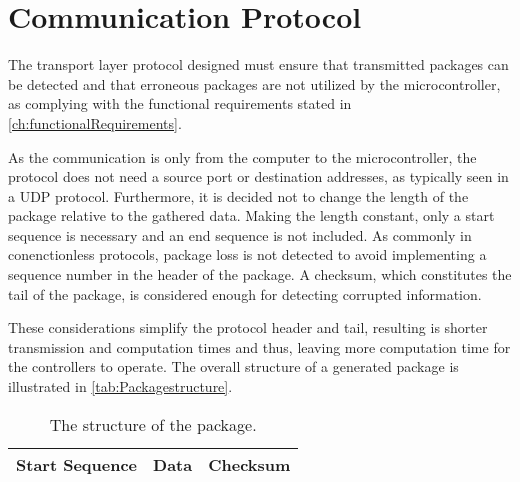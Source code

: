 \section{Communication Protocol}
The transport layer protocol designed must ensure that transmitted packages can be detected and that erroneous packages are not utilized by the microcontroller, as complying with the functional requirements stated in \autoref{ch:functionalRequirements}.
%

As the communication is only from the computer to the microcontroller, the protocol does not need a source port or destination addresses, as typically seen in a UDP protocol. Furthermore, it is decided not to change the length of the package relative to the gathered data. Making the length constant, only a start sequence is necessary and an end sequence is not included. As commonly in conenctionless protocols, package loss is not detected to avoid implementing a sequence number in the header of the package. A checksum, which constitutes the tail of the package, is considered enough for detecting corrupted information. 

These considerations simplify the protocol header and tail, resulting is shorter transmission and computation times and thus, leaving more computation time for the controllers to operate. The overall structure of a generated package is illustrated in \autoref{tab:Packagestructure}.
\begin{table}[H]\centering
\begin{tabular}{|>{\centering\arraybackslash}m{3cm}|>{\centering\arraybackslash}m{2cm}|>{\centering\arraybackslash}m{2cm}|}
\hline
Start Sequence & Data & Checksum \\
\hline
\end{tabular}
\caption{The structure of the package.}
\label{tab:Packagestructure}
\end{table}

